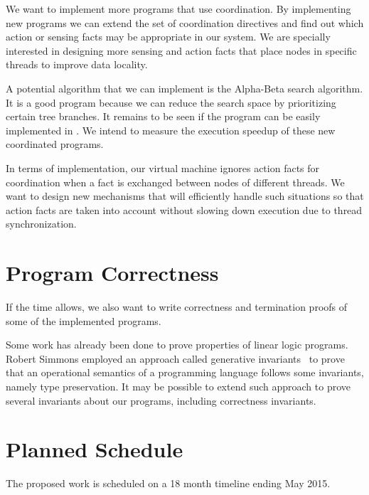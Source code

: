 We want to implement more programs that use coordination. By implementing new programs we can
extend the set of coordination directives and find out which action or sensing facts may be
appropriate in our system. We are specially interested in designing more sensing and action
facts that place nodes in specific threads to improve data locality.

A potential algorithm that we can implement is the Alpha-Beta search algorithm. It is a good program
because we can reduce the search space by prioritizing certain tree branches. It remains to be
seen if the program can be easily implemented in \lang.
We intend to measure the execution speedup of these new coordinated programs.

In terms of implementation, our virtual machine ignores action facts for coordination when a fact
is exchanged between nodes of different threads. We want to design new mechanisms
that will efficiently handle such situations so that action facts are taken into account without
slowing down execution due to thread synchronization.

\section{Program Correctness}

If the time allows, we also want to write correctness and termination proofs of some of the implemented \lang programs.

Some work has already been done to prove properties of linear logic programs.
Robert Simmons employed an approach called generative invariants~\cite{simmons:Thesis} to prove that an operational semantics of a programming
language follows some invariants, namely type preservation. It may be possible to extend such approach to
prove several invariants about our programs, including correctness invariants.

\section{Planned Schedule}

The proposed work is scheduled on a 18 month timeline ending May 2015.

